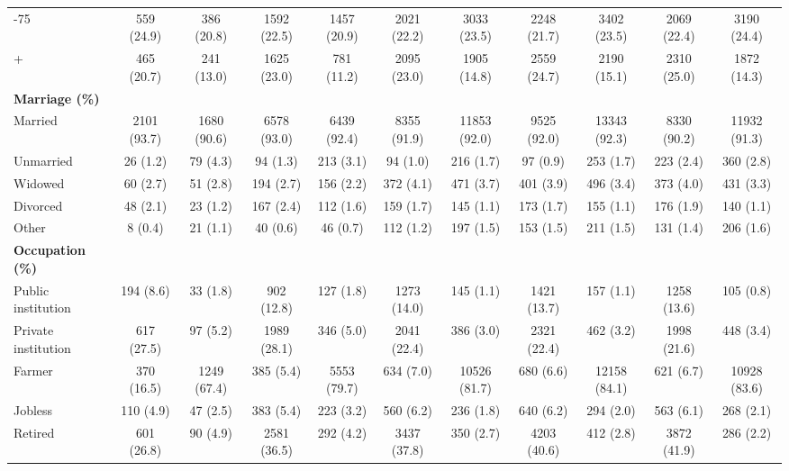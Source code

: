 \documentclass[ijerph,article,submit,moreauthors,pdftex,10pt,a4paper]{mdpi}
\theoremstyle{mdpi}
\newcounter{ex}
\newcounter{re}
\theoremstyle{mdpidefinition}
\begin{document}
\begin{landscape}
\begin{table}[]
{\begin{tabular}{@{}lcccccccccc@{}}
\quad 66-75   & 559 (24.9)   & 386 (20.8)   & 1592 (22.5)  & 1457 (20.9)  & 2021 (22.2)  & 3033 (23.5)  & 2248 (21.7)  & 3402 (23.5)  & 2069 (22.4)  & 3190 (24.4)  \\
\quad 75+     & 465 (20.7)   & 241 (13.0)   & 1625 (23.0)  & 781 (11.2)   & 2095 (23.0)  & 1905 (14.8)  & 2559 (24.7)  & 2190 (15.1)  & 2310 (25.0)  & 1872 (14.3)  \\
\textbf{Marriage (\%)}  &    &    &    &    &    &    &    &    &    &    \\
\quad Married & 2101 (93.7)  & 1680 (90.6)  & 6578 (93.0)  & 6439 (92.4)  & 8355 (91.9)  & 11853 (92.0) & 9525 (92.0)  & 13343 (92.3) & 8330 (90.2)  & 11932 (91.3) \\
\quad Unmarried& 26 (1.2)     & 79 (4.3)     & 94 (1.3)     & 213 (3.1)    & 94 (1.0)     & 216 (1.7)    & 97 (0.9)     & 253 (1.7)    & 223 (2.4)    & 360 (2.8)    \\
\quad Widowed & 60 (2.7)     & 51 (2.8)     & 194 (2.7)    & 156 (2.2)    & 372 (4.1)    & 471 (3.7)    & 401 (3.9)    & 496 (3.4)    & 373 (4.0)    & 431 (3.3)    \\
\quad Divorced& 48 (2.1)     & 23 (1.2)     & 167 (2.4)    & 112 (1.6)    & 159 (1.7)    & 145 (1.1)    & 173 (1.7)    & 155 (1.1)    & 176 (1.9)    & 140 (1.1)    \\
\quad Other   & 8 (0.4)& 21 (1.1)     & 40 (0.6)     & 46 (0.7)     & 112 (1.2)    & 197 (1.5)    & 153 (1.5)    & 211 (1.5)    & 131 (1.4)    & 206 (1.6)    \\
\textbf{Occupation (\%)}&    &    &    &    &    &    &    &    &    &    \\
\quad Public institution & 194 (8.6)    & 33 (1.8)     & 902 (12.8)   & 127 (1.8)    & 1273 (14.0)  & 145 (1.1)    & 1421 (13.7)  & 157 (1.1)    & 1258 (13.6)  & 105 (0.8)    \\
\quad Private institution& 617 (27.5)   & 97 (5.2)     & 1989 (28.1)  & 346 (5.0)    & 2041 (22.4)  & 386 (3.0)    & 2321 (22.4)  & 462 (3.2)    & 1998 (21.6)  & 448 (3.4)    \\
\quad Farmer  & 370 (16.5)   & 1249 (67.4)  & 385 (5.4)    & 5553 (79.7)  & 634 (7.0)    & 10526 (81.7) & 680 (6.6)    & 12158 (84.1) & 621 (6.7)    & 10928 (83.6) \\
\quad Jobless & 110 (4.9)    & 47 (2.5)     & 383 (5.4)    & 223 (3.2)    & 560 (6.2)    & 236 (1.8)    & 640 (6.2)    & 294 (2.0)    & 563 (6.1)    & 268 (2.1)    \\
\quad Retired & 601 (26.8)   & 90 (4.9)     & 2581 (36.5)  & 292 (4.2)    & 3437 (37.8)  & 350 (2.7)    & 4203 (40.6)  & 412 (2.8)    & 3872 (41.9)  & 286 (2.2)    \\

\end{tabular}}
\end{table}
\end{landscape}
\end{document}
